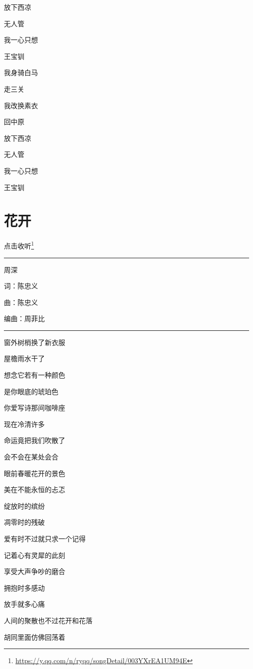 \documentclass[]{ctexbook}
\renewcommand{\href}[2]{#2\footnote{\url{#1}}}
\begin{document}
放下西凉

无人管

我一心只想

王宝钏

我身骑白马

走三关

我改换素衣

回中原

放下西凉

无人管

我一心只想

王宝钏

\section*{花开}\label{bloom}


\href{https://y.qq.com/n/ryqq/songDetail/003YXrEA1UM94E}{点击收听}

\begin{center}\rule{0.5\linewidth}{0.5pt}\end{center}

周深

词：陈忠义

曲：陈忠义

编曲：周菲比

\begin{center}\rule{0.5\linewidth}{0.5pt}\end{center}

窗外树梢换了新衣服

屋檐雨水干了

想念它若有一种颜色

是你眼底的琥珀色

你爱写诗那间咖啡座

现在冷清许多

命运竟把我们吹散了

会不会在某处会合

眼前春暖花开的景色

美在不能永恒的忐忑

绽放时的缤纷

凋零时的残破

爱有时不过就只求一个记得

记着心有灵犀的此刻

享受大声争吵的磨合

拥抱时多感动

放手就多心痛

人间的聚散也不过花开和花落

胡同里面仿佛回荡着
\end{document}
